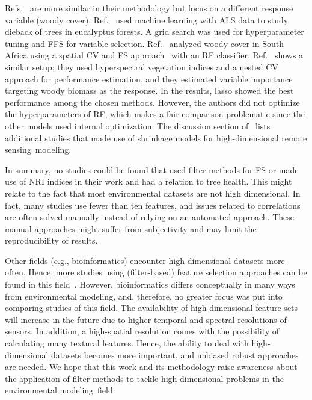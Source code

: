 \documentclass[remotesensing,article,accept,moreauthors,pdftex]{Definitions/mdpi}
\begin{document}
\begin{paracol}{2}
Refs.~\cite{shendryk2016, ludwig2019} are more similar in their methodology but focus on a different response variable (woody cover).
Ref.~\cite{shendryk2016} used machine learning with \ac{ALS} data to study dieback of trees in eucalyptus forests.
A grid search was used for hyperparameter tuning and \ac{FFS} for variable selection.
Ref.~\cite{ludwig2019} analyzed woody cover in South Africa using a spatial \ac{CV} and \ac{FS} approach~\cite{meyer2018} with an RF classifier.
Ref.~\cite{zandler2015} shows a similar setup; they used hyperspectral vegetation indices and a nested CV approach for performance estimation, and they estimated variable importance targeting woody biomass as the response.
In the results, lasso showed the best performance among the chosen methods.
However, the authors did not optimize the hyperparameters of RF, which makes a fair comparison problematic since the other models used internal optimization.
The discussion section of~\cite{zandler2015} lists additional studies that made use of shrinkage models for high-dimensional remote sensing~modeling.

In summary, no studies could be found that used filter methods for \ac{FS} or made use of \ac{NRI} indices in their work and had a relation to tree health.
This might relate to the fact that most environmental datasets are not high dimensional.
In fact, many studies use fewer than ten features, and issues related to correlations are often solved manually instead of relying on an automated approach.
These manual approaches might suffer from subjectivity and may limit the reproducibility of results.

Other fields (e.g., bioinformatics) encounter high-dimensional datasets more often.
Hence, more studies using (filter-based) feature selection approaches can be found in this \linebreak field~\cite{guo2019, radovic2017}.
However, bioinformatics differs conceptually in many ways from environmental modeling, and, therefore, no greater focus was put into comparing studies of this field.
The availability of high-dimensional feature sets will increase in the future due to higher temporal and spectral resolutions of sensors.
In addition, a high-spatial resolution comes with the possibility of calculating many textural features.
Hence, the ability to deal with high-dimensional datasets becomes more important, and unbiased robust approaches are needed.
We hope that this work and its methodology raise awareness about the application of filter methods to tackle high-dimensional problems in the environmental modeling~field.


\end{paracol}
\end{document}
